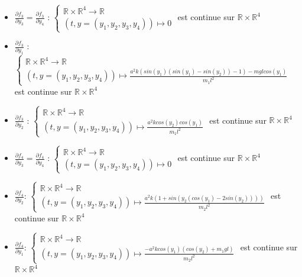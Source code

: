 \documentclass[9pt,a4paper]{article}
\begin{document}
\begin{itemize}[label=\textbullet]
    \item $\frac{\partial f_3}{\partial y_3}=\frac{\partial f_3}{\partial y_4}$ : 
    $\begin{cases}
        \mathbb{R} \times \mathbb{R}^4 \rightarrow \mathbb{R} \\
        (t,y=(y_1,y_2,y_3,y_4)) \mapsto 0
    \end{cases}$ est continue sur $\mathbb{R} \times \mathbb{R}^4$

    \item $\frac{\partial f_3}{\partial y_1}$ : 
    $\begin{cases}
        \mathbb{R} \times \mathbb{R}^4 \rightarrow \mathbb{R} \\
        (t,y=(y_1,y_2,y_3,y_4)) \mapsto \frac{a^2k(sin(y_1)(sin(y_1)-sin(y_2))-1)-mglcos(y_1)}{m_1l^2}
    \end{cases}$ est continue sur $\mathbb{R} \times \mathbb{R}^4$

    \item $\frac{\partial f_3}{\partial y_2}$ : 
    $\begin{cases}
        \mathbb{R} \times \mathbb{R}^4 \rightarrow \mathbb{R} \\
        (t,y=(y_1,y_2,y_3,y_4)) \mapsto \frac{a^2kcos(y_2)cos(y_1)}{m_1l^2}
    \end{cases}$ est continue sur $\mathbb{R} \times \mathbb{R}^4$

    \item $\frac{\partial f_4}{\partial y_3}=\frac{\partial f_4}{\partial y_4}$ : 
    $\begin{cases}
        \mathbb{R} \times \mathbb{R}^4 \rightarrow \mathbb{R} \\
        (t,y=(y_1,y_2,y_3,y_4)) \mapsto 0
    \end{cases}$ est continue sur $\mathbb{R} \times \mathbb{R}^4$

    \item $\frac{\partial f_4}{\partial y_2}$: 
    $\begin{cases}
        \mathbb{R} \times \mathbb{R}^4 \rightarrow \mathbb{R} \\
        (t,y=(y_1,y_2,y_3,y_4)) \mapsto \frac{a^2k(1+sin(y_2(cos(y_1)-2sin(y_2))))}{m_2l^2}
    \end{cases}$ est continue sur $\mathbb{R} \times \mathbb{R}^4$

    \item $\frac{\partial f_4}{\partial y_1}$: 
    $\begin{cases}
        \mathbb{R} \times \mathbb{R}^4 \rightarrow \mathbb{R} \\
        (t,y=(y_1,y_2,y_3,y_4)) \mapsto \frac{-a^2kcos(y_1)(cos(y_2)+m_1gl)}{m_2l^2}
    \end{cases}$ est continue sur $\mathbb{R} \times \mathbb{R}^4$
\end{itemize}
\end{document}

